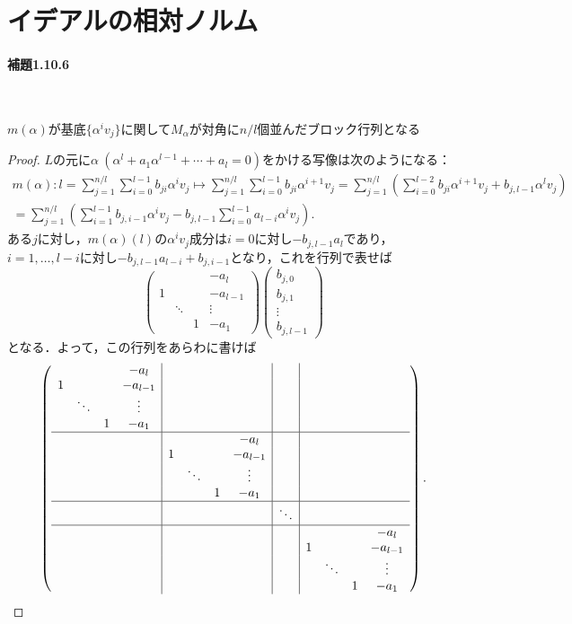 \section{イデアルの相対ノルム}
\paragraph{補題1.10.6}~
\begin{screen}
    $m(\alpha)$が基底$\{\alpha^iv_j\}$に関して$M_\alpha$が対角に$n/l$個並んだブロック行列となる
\end{screen}
\begin{proof}
  $L$の元に$\alpha\ (\alpha^l+a_1\alpha^{l-1}+\cdots+a_l=0)$をかける写像は次のようになる：
  \begin{align*}
    m(\alpha) \colon l = \sum_{j=1}^{n/l}\sum_{i=0}^{l-1}b_{ji}\alpha^iv_j \mapsto \sum_{j=1}^{n/l}\sum_{i=0}^{l-1}b_{ji}\alpha^{i+1}v_j = \sum_{j=1}^{n/l}\left(\sum_{i=0}^{l-2}b_{ji}\alpha^{i+1}v_j+b_{j,l-1}\alpha^lv_j\right) \\
    = \sum_{j=1}^{n/l}\left(\sum_{i=1}^{l-1}b_{j, i-1}\alpha^iv_j-b_{j, l-1}\sum_{i=0}^{l-1}a_{l-i}\alpha^iv_j\right).
  \end{align*}
  ある$j$に対し，$m(\alpha)(l)$の$\alpha^iv_j$成分は$i=0$に対し$-b_{j,l-1}a_l$であり，$i=1,\ldots,l-i$に対し$-b_{j, l-1}a_{l-i}+b_{j, i-1}$となり，これを行列で表せば
  \[
  \left(
  \begin{array}{cccc}
    & & & -a_l\\
    1& & & -a_{l-1}\\
    & \ddots & & \vdots\\
    & & 1 & -a_1
  \end{array}
  \right)\left(
  \begin{array}{c}
    b_{j,0}\\
    b_{j,1}\\
    \vdots\\
    b_{j, l-1}
  \end{array}
  \right)
  \]
  となる．よって，この行列をあらわに書けば
  \[
  \left(
  \begin{array}{cccc|cccc|c|cccc}
    & & & -a_l & & & & & & & &\\
    1& & & -a_{l-1} & & & & & & & &\\
    & \ddots & & \vdots & & & & & & & &\\
    & & 1 & -a_1 & & & & & & & &\\
    \hline
    & & & & & & & -a_l & & & & &\\
    & & & & 1& & & -a_{l-1} & & & & &\\
    & & & & & \ddots & & \vdots & & & & &\\
    & & & & & & 1 & -a_1 & & & & &\\
    \hline
    & & & & & &  &  & \ddots & & & &\\
    \hline
    & & & & & & & & & & & & -a_l\\
    & & & & & & & & & 1 & & & -a_{l-1}\\
    & & & & & & & & & & \ddots & & \vdots\\
    & & & & & & & & & & & 1 & -a_1
  \end{array}
  \right).
  \]
\end{proof}

